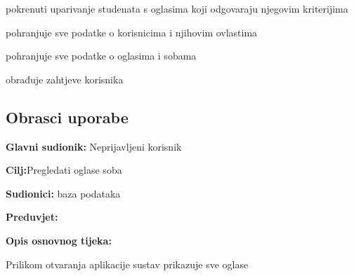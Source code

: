 \begin{packed_enum}
	\item  {}
	
	\begin{packed_enum}
		\item pokrenuti uparivanje studenata s oglasima koji odgovaraju njegovim kriterijima
		
	\end{packed_enum}
	
	\item  {}
	
	\begin{packed_enum}
		\item pohranjuje sve podatke o korisnicima i njihovim ovlastima
		\item pohranjuje sve podatke o oglasima i sobama
	\end{packed_enum}
	
	
	\item  {}
	
	\begin{packed_enum}
		\item obrađuje zahtjeve korisnika
		
	\end{packed_enum}
	
	
\end{packed_enum}

\eject 



\subsection{Obrasci uporabe}




\noindent {}
\begin{packed_item}
	
	\item \textbf{Glavni sudionik: }Neprijavljeni korisnik
	\item  \textbf{Cilj:}Pregledati oglase soba
	\item  \textbf{Sudionici:} baza podataka
	\item  \textbf{Preduvjet:} 
	\item  \textbf{Opis osnovnog tijeka:}
	
	\item[] \begin{packed_enum}
		
		\item Prilikom otvaranja aplikacije sustav prikazuje sve oglase
		
	\end{packed_enum}
	
	
	
	
\end{packed_item}


